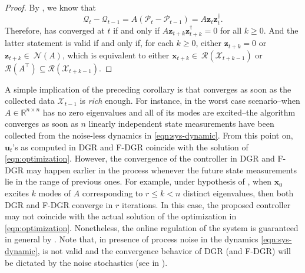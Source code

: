 \documentclass[journal]{IEEEtran}
\theoremstyle{definition}
\theoremstyle{remark}
\newcommand\x{{\bm x}}
\def\u{{\bm u}}
\newcommand\z{{\bm z}}
\begin{document}
{\color{violet}
\begin{proof}
By , we know that 
\[\mathcal{Q}_t - \mathcal{Q}_{t-1} = A (\mathcal{P}_t - \mathcal{P}_{t-1}) = A \z_t \z_t^\dagger.\]
Therefore,  has converged at $t$ if and only if $A \z_{t+k} \z_{t+k}^\dagger = 0$ for all $k \geq 0$. 
And the latter statement is valid if and only if, for each $k \geq 0$, either $\z_{t+k} = 0$ or $\z_{t+k} \in~\mathcal{N}(A)$, which is equivalent to either $\x_{t+k} \in~\mathcal{R}(\mathcal{X}_{t+k-1})$ or $\mathcal{R}(A^\intercal) \subseteq \mathcal{R}(\mathcal{X}_{t+k-1})$.
\end{proof}


A simple implication of the preceding corollary is that  converges as soon as the collected data $\mathcal{X}_{t-1}$ is \emph{rich} enough. For instance, in the worst case scenario--when $A \in \mathbb{R}^{n\times n}$ has no zero eigenvalues and all of its modes are excited--the algorithm converges as soon as $n$ linearly independent state measurements have been collected from the noise-less dynamics in \cref{eqn:sys-dynamic}. From this point on, $\u_t$'s as computed in \ac{DGR} and \ac{F-DGR} coincide with the  solution of \cref{eqn:optimization}. However, the convergence of the controller in \ac{DGR} and \ac{F-DGR} may happen earlier in the process whenever the future state measurements lie in the range of previous ones. For example, under hypothesis of , when $\x_0$ excites $k$ modes of $A$ corresponding to $r \leq k < n$ distinct eigenvalues, then both \ac{DGR} and \ac{F-DGR} converge in $r$ iterations. In this case, the proposed controller may not coincide with the actual solution of the optimization in \cref{eqn:optimization}. Nonetheless, the online regulation of the system is guaranteed in general by . Note that, in presence of process noise in the dynamics \cref{eqn:sys-dynamic},  is not valid and the convergence behavior of \ac{DGR} (and \ac{F-DGR}) will be dictated by the noise stochastics (see  in ).
}
\end{document}
